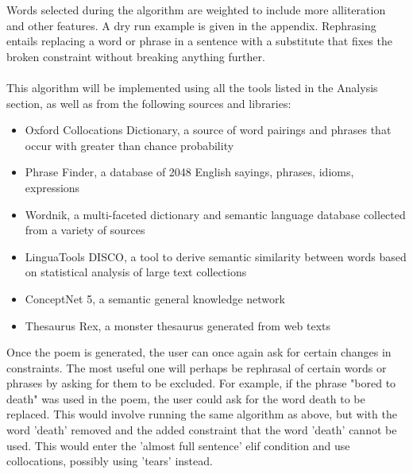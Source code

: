 Words selected during the algorithm are weighted to include more alliteration and other features. A dry run example is given in the appendix. Rephrasing entails replacing a word or phrase in a sentence with a substitute that fixes the broken constraint without breaking anything further. 
\\\\
This algorithm will be implemented using all the tools listed in the Analysis section, as well as from the following sources and libraries:
\begin{itemize}
\setlength{\itemsep}{0pt}
\item{Oxford Collocations Dictionary, a source of word pairings and phrases that occur with greater than chance probability}
\item{Phrase Finder, a database of 2048 English sayings, phrases, idioms, expressions}
\item{Wordnik, a multi-faceted dictionary and semantic language database collected from a variety of sources}
\item{LinguaTools DISCO, a tool to derive semantic similarity between words based on statistical analysis of large text collections}
\item{ConceptNet 5, a semantic general knowledge network}
\item{Thesaurus Rex, a monster thesaurus generated from web texts}
\end{itemize}

Once the poem is generated, the user can once again ask for certain changes in constraints. The most useful one will perhaps be rephrasal of certain words or phrases by asking for them to be excluded. For example, if the phrase "bored to death" was used in the poem, the user could ask for the word death to be replaced. This would involve running the same algorithm as above, but with the word 'death' removed and the added constraint that the word 'death' cannot be used. This would enter the 'almost full sentence' elif condition and use collocations, possibly using 'tears' instead.



